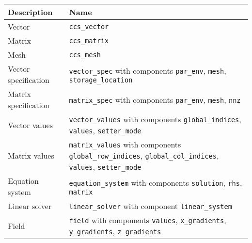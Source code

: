 \documentclass[11pt]{report}
\begin{document}
  \begin{tabularx}{\textwidth}{|l|X|}
  \hline
  \textbf{Description}                       & \textbf{Name}   \\
  \hline
  \hline
  Vector               & \texttt{ccs\_vector}                                                                             \\
  Matrix               & \texttt{ccs\_matrix}                                                                                    \\
  Mesh                 & \texttt{ccs\_mesh}                                                                                      \\
  Vector specification & \texttt{vector\_spec} with components \texttt{par\_env}, \texttt{mesh}, \texttt{storage\_location}                           \\
  Matrix specification & \texttt{matrix\_spec} with components \texttt{par\_env}, \texttt{mesh}, \texttt{nnz}                                         \\
  Vector values        & \texttt{vector\_values} with components \texttt{global\_indices}, \texttt{values}, \texttt{setter\_mode}                     \\
  Matrix values        & \texttt{matrix\_values} with components \texttt{global\_row\_indices}, \texttt{global\_col\_indices}, \texttt{values}, \texttt{setter\_mode} \\
  Equation system      & \texttt{equation\_system} with components \texttt{solution}, \texttt{rhs}, \texttt{matrix}                                           \\
  Linear solver        & \texttt{linear\_solver} with component \texttt{linear\_system}                                                     \\
  Field                & \texttt{field} with components \texttt{values}, \texttt{x\_gradients}, \texttt{y\_gradients}, \texttt{z\_gradients}                          \\
  \hline
  \end{tabularx}
\end{document}
